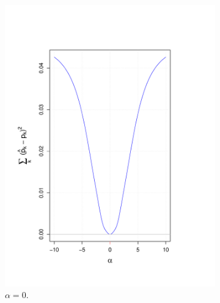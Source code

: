\documentclass[10pt]{article}
\begin{document}
\begin{figure}[H]
\begin{subfigure}{.25\textwidth}
  \includegraphics[width=\linewidth]{alpha_trace_0.pdf}
  \caption{ $\alpha = 0$.}
  \label{fig: alpha0}
\end{subfigure}%
\begin{subfigure}{.25\textwidth}
  \centering

\end{subfigure}
\end{figure}
\end{document}
